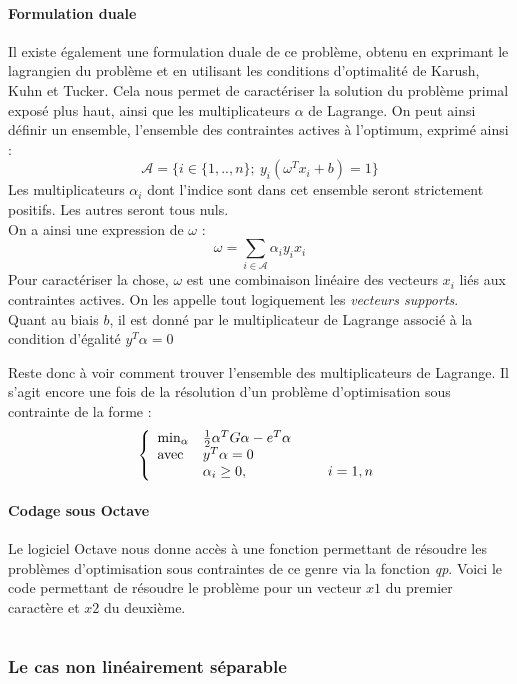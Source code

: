 \paragraph{Formulation duale\\}
Il existe également une formulation duale de ce problème, obtenu en exprimant le lagrangien du problème et en utilisant les conditions d'optimalité de Karush, Kuhn et Tucker. Cela nous permet de caractériser la solution du problème primal exposé plus haut, ainsi que les multiplicateurs $\alpha$ de Lagrange. On peut ainsi définir un ensemble, l'ensemble des contraintes actives à l'optimum, exprimé ainsi :
	\[\mathcal{A}=\{i\in\{1,..,n\};\ y_i(\omega^Tx_i+b)=1\}\]
Les multiplicateurs $\alpha_i$ dont l'indice sont dans cet ensemble seront strictement positifs. Les autres seront tous nuls. \\
On a ainsi une expression de $\omega$ :
\[\omega=\sum_{i\in\mathcal{A}} \alpha_i y_ix_i\]
Pour caractériser la chose, $\omega$ est une combinaison linéaire des vecteurs $x_i$ liés aux contraintes actives. On les appelle tout logiquement les \textit{vecteurs supports}.\\
Quant au biais $b$, il est donné par le multiplicateur de Lagrange associé à la condition d'égalité $y^T\alpha=0$

\bigskip
Reste donc à voir comment trouver l'ensemble des multiplicateurs de Lagrange. Il s'agit encore une fois de la résolution d'un problème d'optimisation sous contrainte de la forme :
	\[\left\{\begin{array}{l l}
	\min_\alpha & \frac{1}{2} \alpha^TG\alpha -e^T\alpha\\
	\text{avec } & y^T\alpha=0\\
		& \alpha_i\geq 0, \hspace{2cm} i=1,n
	\end{array}\right.\]

\paragraph{Codage sous Octave\\}
Le logiciel Octave nous donne accès à une fonction permettant de résoudre les problèmes d'optimisation sous contraintes de ce genre via la fonction \textit{qp}. Voici le code permettant de résoudre le problème pour un vecteur $x1$ du premier caractère et $x2$ du deuxième. 

\inputminted{octave}{fonctions/svmLineaire.m}

\subsubsection{Le cas non linéairement séparable}

